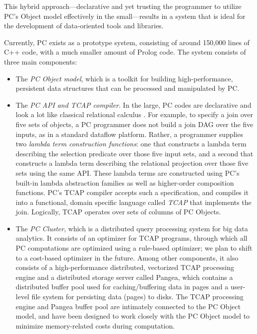 This hybrid approach---declarative and yet trusting the programmer
to utilize PC's Object model effectively
in the small---results in a system that is ideal for the 
development of data-oriented tools and libraries.

Currently, PC exists as a prototype system, consisting of around
150,000 lines of C++ code, with a much smaller amount of Prolog code.
The system consists of three main components: 

\begin{itemize}
\item The \emph{PC Object model}, which is a toolkit for building high-performance, persistent data structures that can be 
processed and manipulated by PC.  

\item The \emph{PC API and TCAP compiler}.  In the large, PC codes are declarative and look a lot like classical relational calculus \cite{codd1971data}.  For example, to specify a join over five sets of objects, a PC programmer does not build a join DAG over the five inputs, as in a standard
dataflow platform.  Rather, a programmer 
supplies two \emph{lambda term construction functions}: one that constructs a lambda term describing the selection
predicate over those five input sets, 
and a second that constructs a lambda term describing the relational projection over those five sets
using the same API.  These lambda terms are constructed using PC's built-in lambda abstraction families as well as higher-order composition functions.
 PC's TCAP compiler 
accepts such a specification, and compiles it into a functional, domain specific language called \emph{TCAP} that implements
the join.  Logically, TCAP operates over
sets of columns of PC Objects. 

\item The \emph{PC Cluster}, which is a distributed query processing
  system for big data analytics. It consists of an optimizer for TCAP
  programs, through which all PC computations are optimized using a rule-based
optimizer; we plan to shift to a cost-based optimizer in the
future. Among other components, it also consists of a
high-performance distributed, vectorized TCAP processing engine and a distributed
storage server called Pangea, which contains a distributed buffer
pool used for caching/buffering data in pages and a user-level file system
for persisting data (pages) to disks. 
The TCAP processing engine and Pangea buffer pool are intimately connected to the PC Object model, 
and have been designed to work closely with the PC Object model to minimize memory-related costs during computation.


\end{itemize}

